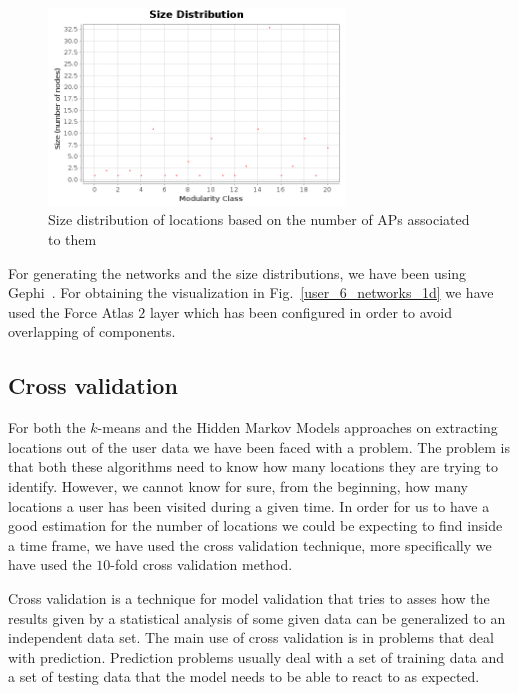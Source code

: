 \begin{figure}[!h]
\centering
\includegraphics[width=0.7\textwidth]{figures/networks/communities-size-distribution.png}
\caption{Size distribution of locations based on the number of APs associated to
them }
\label{user_6_size_distribution_1d}
\end{figure}

For generating the networks and the size distributions, we have been using
Gephi~\cite{Gephi}. For obtaining the visualization in
Fig.~\ref{user_6_networks_1d} we have used the Force Atlas $2$ layer which has
been configured in order to avoid overlapping of components.

\subsection{Cross validation}
\label{cross_valid}

For both the $k$-means and the Hidden Markov Models approaches on extracting
locations out of the user data we have been faced with a problem. The problem is
that both these algorithms need to know how many locations they are trying to
identify. However, we cannot know for sure, from the beginning, how many
locations a user has been visited during a given time. In order for us to have a
good estimation for the number of locations we could be expecting to find inside
a time frame, we have used the cross validation technique, more specifically we
have used the $10$-fold cross validation method.

Cross validation \cite{Kohavi95astudy} is a technique for model validation that
tries to asses how the results given by a statistical analysis of some given
data can be generalized to an independent data set. The main use of cross
validation is in problems that deal with prediction. Prediction problems usually
deal with a set of training data and a set of testing data that the model needs
to be able to react to as expected.


